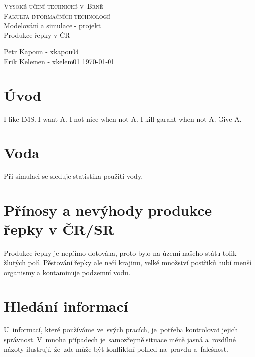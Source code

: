 \documentclass[11pt,a4paper,titlepage]{article}
\begin{document}
\begin{titlepage}
\begin{center}
    {\LARGE\textsc{Vysoké učení technické v~Brně}}\\
    \smallskip
    {\Large\textsc{Fakulta informačních technologií}}\\
    \bigskip
    \LARGE{Modelování a simulace - projekt}\\
    \smallskip
    \Huge{Produkce řepky v ČR}\\
\end{center}
    {\Large Petr Kapoun - xkapou04 \\ Erik Kelemen - xkelem01 \hfill \today }
\end{titlepage}

\tableofcontents
\newpage


\section{Úvod}
I like IMS. I want A. I not nice when not A. I kill garant when not A. Give A.








\section{Voda}
Při simulaci se sleduje statistika použití vody.





\section{Přínosy a nevýhody produkce řepky v ČR/SR}
Produkce řepky je nepřímo dotována, proto bylo na území našeho státu tolik žlutých polí.
Pěstování řepky ale nečí krajinu, velké množství postřiků hubí menší organismy a kontaminuje podzemní vodu.


\section{Hledání informací}
U~informací, které používáme ve~svých pracích, je~potřeba kontrolovat jejich správnost. V~mnoha případech je~samozřejmě situace méně jasná a~rozdílné názoty ilustrují, že~zde může být konfliktní pohled na~pravdu a~falešnost.\cite{Ar_Information}
\end{document}
